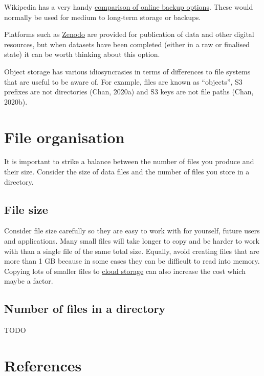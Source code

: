 \documentclass[12pt,a4paper,oneside]{report}
\begin{document}
Wikipedia has a very handy
\href{https://en.wikipedia.org/wiki/Comparison_of_online_backup_services}{comparison
of online backup options}. These would normally be used for medium to
long-term storage or backups.

Platforms such as \href{https://zenodo.org}{Zenodo} are provided for
publication of data and other digital resources, but when datasets have
been completed (either in a raw or finalised state) it can be worth
thinking about this option.

Object storage has various idiosyncrasies in terms of differences to
file systems that are useful to be aware of. For example, files are
known as ``objects'', S3 prefixes are not directories (Chan, 2020a) and
S3 keys are not file paths (Chan, 2020b).

\hypertarget{file-organisation}{%
\section{File organisation}\label{file-organisation}}

It is important to strike a balance between the number of files you
produce and their size. Consider the size of data files and the number
of files you store in a directory.

\hypertarget{file-size}{%
\subsection{File size}\label{file-size}}

Consider file size carefully so they are easy to work with for yourself,
future users and applications. Many small files will take longer to copy
and be harder to work with than a single file of the same total size.
Equally, avoid creating files that are more than 1 GB because in some
cases they can be difficult to read into memory. Copying lots of smaller
files to \protect\hyperlink{cloud-storage}{cloud storage} can also
increase the cost which maybe a factor.

\hypertarget{number-of-files-in-a-directory}{%
\subsection{Number of files in a
directory}\label{number-of-files-in-a-directory}}

TODO

\hypertarget{references}{%
\section{References}\label{references}}
\end{document}
